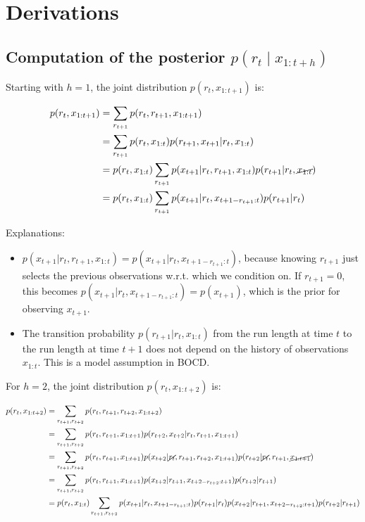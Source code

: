 \documentclass{article}
\begin{document}
\section*{Derivations}

\subsection*{Computation of the posterior $p\left(r_{t} \mid x_{1:t+h}\right)$}

Starting with $h=1$, the joint distribution $p(r_{t},x_{1:t+1})$ is:

\begin{align}
p(r_{t},x_{1:t+1}) & =\sum_{r_{t+1}}p(r_{t},r_{t+1},x_{1:t+1})\\
 & =\sum_{r_{t+1}}p(r_{t},x_{1:t})p(r_{t+1},x_{t+1}\vert r_{t},x_{1:t})\\
 & =p(r_{t},x_{1:t})\sum_{r_{t+1}}p(x_{t+1}\vert r_{t},r_{t+1},x_{1:t})p(r_{t+1}\vert r_{t},\cancel{x_{1:t}})\\
 & =p(r_{t},x_{1:t})\sum_{r_{t+1}}p(x_{t+1}\vert r_{t},x_{t+1-r_{t+1}:t})p(r_{t+1}\vert r_{t})
\end{align}

Explanations:
\begin{itemize}
    \item $p(x_{t+1}\vert r_{t},r_{t+1},x_{1:t})=p(x_{t+1}\vert r_{t},x_{t+1-r_{t+1}:t})$, because knowing $r_{t+1}$ just selects the previous observations w.r.t. which we condition on. If $r_{t+1}=0$, this becomes $p(x_{t+1}\vert r_{t},x_{t+1-r_{t+1}:t})=p(x_{t+1})$, which is the prior for observing $x_{t+1}$.
    \item The transition probability $p(r_{t+1}\vert r_{t},x_{1:t})$ from the run length at time $t$ to the run length at time $t+1$ does not depend on the history of observations $x_{1:t}$. This is a model assumption in BOCD.
\end{itemize}

For $h=2$, the joint distribution $p(r_{t},x_{1:t+2})$ is:

\begin{align}
p(r_{t},x_{1:t+2}) & =\sum_{r_{t+1},r_{t+2}}p(r_{t},r_{t+1},r_{t+2},x_{1:t+2})\\
 & =\sum_{r_{t+1},r_{t+2}}p(r_{t},r_{t+1},x_{1:t+1})p(r_{t+2},x_{t+2}\vert r_{t},r_{t+1},x_{1:t+1})\\
 & =\sum_{r_{t+1},r_{t+2}}p(r_{t},r_{t+1},x_{1:t+1})p(x_{t+2}\vert\cancel{r_{t}},r_{t+1},r_{t+2},x_{1:t+1})p(r_{t+2}\vert\cancel{r_{t}},r_{t+1},\cancel{x_{1:t+1}})\\
 & =\sum_{r_{t+1},r_{t+2}}p(r_{t},r_{t+1},x_{1:t+1})p(x_{t+2}\vert r_{t+1},x_{t+2-r_{t+2}:t+1})p(r_{t+2}\vert r_{t+1})\\
 & =p(r_{t},x_{1:t})\sum_{r_{t+1},r_{t+2}}p(x_{t+1}\vert r_{t},x_{t+1-r_{t+1}:t})p(r_{t+1}\vert r_{t})p(x_{t+2}\vert r_{t+1},x_{t+2-r_{t+2}:t+1})p(r_{t+2}\vert r_{t+1})
\end{align}
\end{document}

